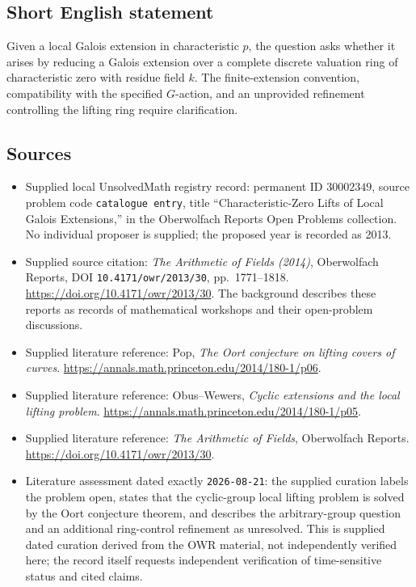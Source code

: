 \documentclass[11pt]{article}
\begin{document}
\subsection{Short English statement}
Given a local Galois extension in characteristic \(p\), the question asks whether it arises by reducing a Galois extension over a complete discrete valuation ring of characteristic zero with residue field \(k\). The finite-extension convention, compatibility with the specified \(G\)-action, and an unprovided refinement controlling the lifting ring require clarification.
\subsection{Sources}
\begin{itemize}
\item Supplied local UnsolvedMath registry record: permanent ID \(30002349\), source problem code \texttt{catalogue entry}, title ``Characteristic-Zero Lifts of Local Galois Extensions,'' in the Oberwolfach Reports Open Problems collection. No individual proposer is supplied; the proposed year is recorded as 2013.
\item Supplied source citation: \emph{The Arithmetic of Fields (2014)}, Oberwolfach Reports, DOI \texttt{10.4171/owr/2013/30}, pp.\ 1771--1818. \url{https://doi.org/10.4171/owr/2013/30}. The background describes these reports as records of mathematical workshops and their open-problem discussions.
\item Supplied literature reference: Pop, \emph{The Oort conjecture on lifting covers of curves}. \url{https://annals.math.princeton.edu/2014/180-1/p06}.
\item Supplied literature reference: Obus--Wewers, \emph{Cyclic extensions and the local lifting problem}. \url{https://annals.math.princeton.edu/2014/180-1/p05}.
\item Supplied literature reference: \emph{The Arithmetic of Fields}, Oberwolfach Reports. \url{https://doi.org/10.4171/owr/2013/30}.
\item Literature assessment dated exactly \texttt{2026-08-21}: the supplied curation labels the problem open, states that the cyclic-group local lifting problem is solved by the Oort conjecture theorem, and describes the arbitrary-group question and an additional ring-control refinement as unresolved. This is supplied dated curation derived from the OWR material, not independently verified here; the record itself requests independent verification of time-sensitive status and cited claims.
\end{itemize}
\end{document}
